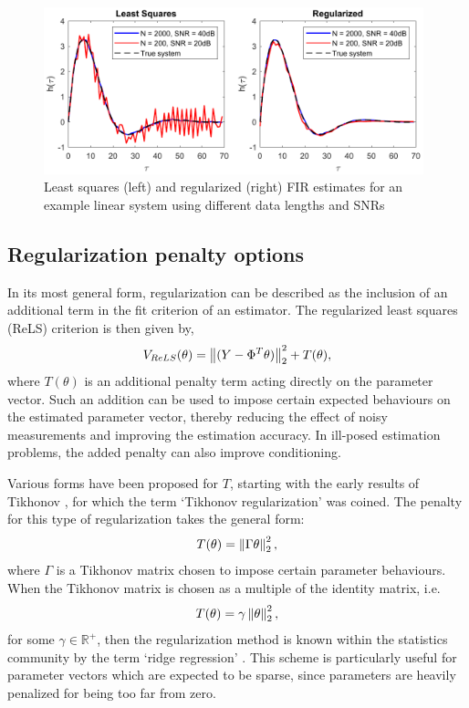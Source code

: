 \begin{figure}[h]
\centering
\includegraphics[width = 0.98\textwidth]{Chapter2_SysIDandControl/LS_example2}
\caption{Least squares (left) and regularized (right) FIR estimates for an example linear system using different data lengths and SNRs}
\label{fig:ExampleImpulseEsts}
\end{figure}

\subsection{Regularization penalty options}

In its most general form, regularization can be described as the inclusion of an additional term in the fit criterion of an estimator. The regularized least squares (ReLS) criterion is then given by,
\begin{equation}
V_{ReLS}(\theta) = \left\lVert(Y-\Phi^T \theta)\right\rVert_2^2 + T(\theta),
\end{equation} 
where $T(\theta)$ is an additional penalty term acting directly on the parameter vector. Such an addition can be used to impose certain expected behaviours on the estimated parameter vector, thereby reducing the effect of noisy measurements and improving the estimation accuracy. In ill-posed estimation problems, the added penalty can also improve conditioning.

Various forms have been proposed for $T$, starting with the early results of Tikhonov \cite{Tikhonov1963}, for which the term `Tikhonov regularization' was coined. The penalty for this type of regularization takes the general form:
\begin{equation}
T(\theta) = \left\lVert\Gamma \theta\right\rVert_2^2,
\label{eq:TikhonovPenalty}
\end{equation}  
where $\Gamma$ is a Tikhonov matrix chosen to impose certain parameter behaviours. When the Tikhonov matrix is chosen as a multiple of the identity matrix, i.e.
\begin{equation}
T(\theta) = \gamma \left\lVert\theta\right\rVert_2^2,
\end{equation}
for some $\gamma \in \mathbb{R}^+$, then the regularization method is known within the statistics community by the term `ridge regression' \cite{Hoerl1970}. This scheme is particularly useful for parameter vectors which are expected to be sparse, since parameters are heavily penalized for being too far from zero.

